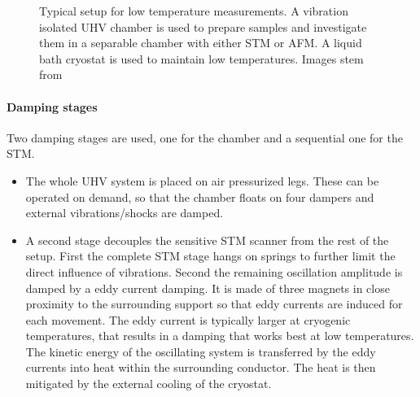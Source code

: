 \begin{figure}[ht]
{		\label{fig:STM-cryo}
	}
	\caption{Typical setup for low temperature measurements. A vibration isolated UHV chamber is used to prepare samples and investigate them in a separable chamber with either STM or AFM. A liquid bath cryostat is used to maintain low temperatures. Images stem from \textcolor{red}{\cite{diss-knud}}}
	\label{fig:STM}
\end{figure}

\paragraph{Damping stages}
Two damping stages are used, one for the chamber and a sequential one for the STM.
\begin{itemize}
	\item The whole UHV system is placed on air pressurized legs. These can be operated on demand, so that the chamber floats on four dampers and external vibrations/shocks are damped.
	\item A second stage decouples the sensitive STM scanner from the rest of the setup. First the complete STM stage hangs on springs to further limit the direct influence of vibrations. Second the remaining oscillation amplitude is damped by a eddy current damping. It is made of three magnets in close proximity to the surrounding support so that eddy currents are induced for each movement. The eddy current is typically larger at cryogenic temperatures, that results in a damping that works best at low temperatures. The kinetic energy of the oscillating system is transferred by the eddy currents into heat within the surrounding conductor. The heat is then mitigated by the external cooling of the cryostat.
\end{itemize}

